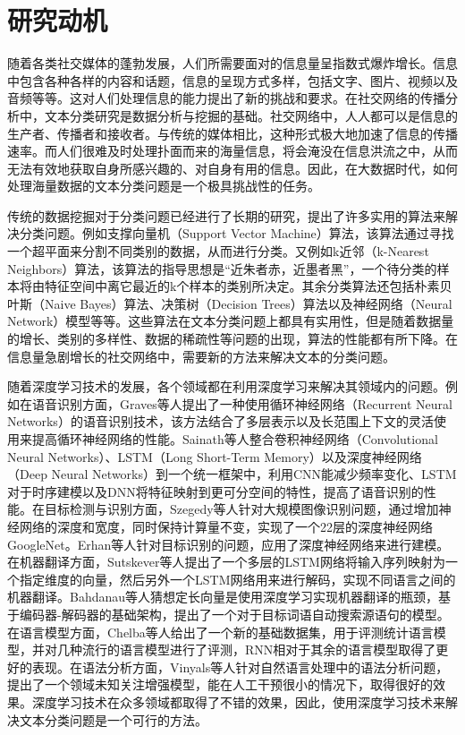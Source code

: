 \section{研究动机}
\label{sec3:motivation}
随着各类社交媒体的蓬勃发展，人们所需要面对的信息量呈指数式爆炸增长。信息中包含各种各样的内容和话题，信息的呈现方式多样，包括文字、图片、视频以及音频等等。这对人们处理信息的能力提出了新的挑战和要求。在社交网络的传播分析中，文本分类研究是数据分析与挖掘的基础。社交网络中，人人都可以是信息的生产者、传播者和接收者。与传统的媒体相比，这种形式极大地加速了信息的传播速率。而人们很难及时处理扑面而来的海量信息，将会淹没在信息洪流之中，从而无法有效地获取自身所感兴趣的、对自身有用的信息。因此，在大数据时代，如何处理海量数据的文本分类问题是一个极具挑战性的任务。

传统的数据挖掘对于分类问题已经进行了长期的研究，提出了许多实用的算法来解决分类问题。例如支撑向量机（Support Vector Machine）算法，该算法通过寻找一个超平面来分割不同类别的数据，从而进行分类。又例如k近邻（k-Nearest Neighbors）算法，该算法的指导思想是“近朱者赤，近墨者黑”，一个待分类的样本将由特征空间中离它最近的k个样本的类别所决定。其余分类算法还包括朴素贝叶斯（Naive Bayes）算法、决策树（Decision Trees）算法以及神经网络（Neural Network）模型等等。这些算法在文本分类问题上都具有实用性，但是随着数据量的增长、类别的多样性、数据的稀疏性等问题的出现，算法的性能都有所下降。在信息量急剧增长的社交网络中，需要新的方法来解决文本的分类问题。

随着深度学习技术的发展，各个领域都在利用深度学习来解决其领域内的问题。例如在语音识别方面，Graves等人提出了一种使用循环神经网络（Recurrent Neural Networks）的语音识别技术，该方法结合了多层表示以及长范围上下文的灵活使用来提高循环神经网络的性能。Sainath等人整合卷积神经网络（Convolutional Neural Networks）、LSTM（Long Short-Term Memory）以及深度神经网络（Deep Neural Networks）到一个统一框架中，利用CNN能减少频率变化、LSTM对于时序建模以及DNN将特征映射到更可分空间的特性，提高了语音识别的性能。在目标检测与识别方面，Szegedy等人针对大规模图像识别问题，通过增加神经网络的深度和宽度，同时保持计算量不变，实现了一个22层的深度神经网络GoogleNet。Erhan等人针对目标识别的问题，应用了深度神经网络来进行建模。在机器翻译方面，Sutskever等人提出了一个多层的LSTM网络将输入序列映射为一个指定维度的向量，然后另外一个LSTM网络用来进行解码，实现不同语言之间的机器翻译。Bahdanau等人猜想定长向量是使用深度学习实现机器翻译的瓶颈，基于编码器-解码器的基础架构，提出了一个对于目标词语自动搜索源语句的模型。在语言模型方面，Chelba等人给出了一个新的基础数据集，用于评测统计语言模型，并对几种流行的语言模型进行了评测，RNN相对于其余的语言模型取得了更好的表现。在语法分析方面，Vinyals等人针对自然语言处理中的语法分析问题，提出了一个领域未知关注增强模型，能在人工干预很小的情况下，取得很好的效果。深度学习技术在众多领域都取得了不错的效果，因此，使用深度学习技术来解决文本分类问题是一个可行的方法。

